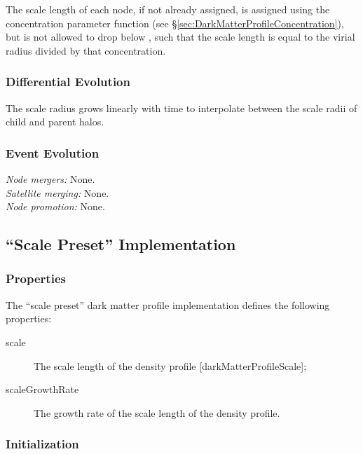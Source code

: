 The scale length of each node, if not already assigned, is assigned using the concentration parameter function (see \S\ref{sec:DarkMatterProfileConcentration}), but is not allowed to drop below {\normalfont \ttfamily [darkMatterProfileMinimumConcentration]}, such that the scale length is equal to the virial radius divided by that concentration.

\subsubsection{Differential Evolution}

The scale radius grows linearly with time to interpolate between the scale radii of child and parent halos.

\subsubsection{Event Evolution}

\noindent\emph{Node mergers:} None.\\

\noindent\emph{Satellite merging:} None.\\

\noindent\emph{Node promotion:} None.\\

\subsection{``Scale Preset'' Implementation}\label{sec:DarkMatterProfileScalePreset}

\subsubsection{Properties}

The ``scale preset'' dark matter profile implementation defines the following properties:
\begin{description}
 \item [{\normalfont \ttfamily scale}] The scale length of the density profile [{\normalfont \ttfamily darkMatterProfileScale}];
 \item [{\normalfont \ttfamily scaleGrowthRate}] The growth rate of the scale length of the density profile.
\end{description}

\subsubsection{Initialization}

